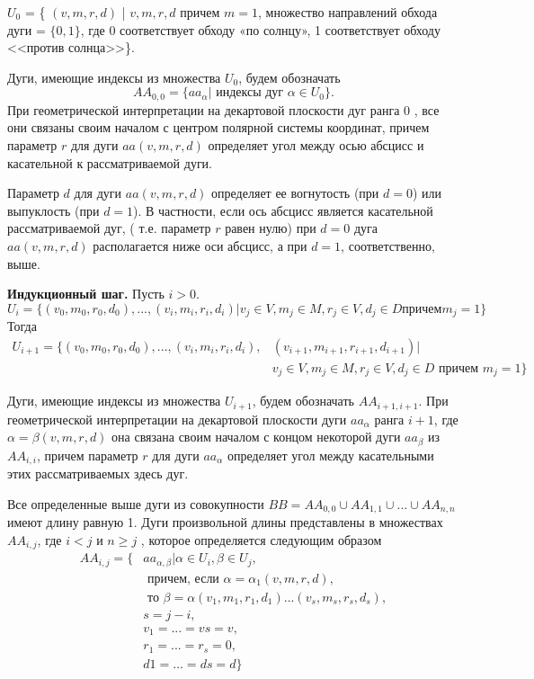 $U_0$  = \{ $(v, m, r, d)$ | $v , m , r , d$  причем  $m = 1$, множество направлений  обхода дуги   =  $\{0, 1\}$, где  0  соответствует обходу «по солнцу»,  1 соответствует обходу <<против солнца>>\}. 

\begin{remark}
Дуги, имеющие индексы из множества $U_0$,  будем обозначать 
$$AA_{0,0}  = \{aa_\alpha | \text{ индексы дуг } \alpha \in U_0 \}. $$
При геометрической интерпретации на декартовой плоскости дуг ранга 0 ,  все они связаны своим началом с центром полярной системы координат, причем параметр $r$  для дуги  $aa(v, m, r, d)$ определяет угол между осью абсцисс и касательной к  рассматриваемой дуги.  

Параметр  $d$  для дуги   $aa(v, m, r, d)$  определяет  ее вогнутость (при $d = 0$) или  выпуклость (при $d = 1$).  В частности, если   ось абсцисс является касательной  рассматриваемой дуг, ( т.е. параметр  $r$ равен нулю)  при  $d = 0$ дуга $aa(v, m, r, d)$ располагается ниже оси абсцисс, а при $d = 1$, соответственно, выше.
\end{remark}

\textbf{Индукционный шаг.}  Пусть $i > 0$. 
$$U_i = \{ (v_0, m_0, r_0, d_0), ...,(v_i, m_i, r_i, d_i) | v_j \in V , m_j \in M , r_j \in V, d_j \in D  причем  m_j = 1\}$$
Тогда
\begin{equation}
\begin{split}
U_{i+1} = \{ (v_0, m_0, r_0, d_0), ...,(v_i, m_i, r_i, d_i),& (v_{i+1}, m_{i+1}, r_{i+1}, d_{i+1}) | \\
& v_j \in V , m_j \in M , r_j \in V, d_j \in D  \text{ причем }  m_j = 1\}
\label{overlaps:4}
\end{split}
\end{equation}

\begin{remark}
Дуги, имеющие индексы из множества $U_{i+1}$,  будем обозначать $AA_{i+1,i+1}$. 
При геометрической интерпретации на декартовой плоскости дуги  $aa_\alpha$  ранга $i+1$,  где  $\alpha = \beta(v, m, r, d)$  она  связана своим началом с концом некоторой дуги $aa_\beta$ из $AA_{i,i}$, причем параметр $r$ для дуги $aa_\alpha$  определяет угол между  касательными этих  рассматриваемых здесь  дуг.  
\end{remark}
Все определенные выше дуги из совокупности 
$BB = AA_{0,0} \cup AA_{1,1} \cup ... \cup AA_{n,n}$  имеют длину равную 1. Дуги произвольной длины представлены в множествах $AA_{i,j}$,  где $i  <  j$  и  $n \geq  j$ , которое определяется следующим образом  
\begin{equation}
\begin{split}
AA_{i,j} = \{&aa_{\alpha,\beta} | \alpha \in U_i, \beta \in U_j, \\
&\text{ причем, если }  \alpha = \alpha_1(v, m, r, d), \\
&\text{ то } \beta = \alpha(v_1, m_1, r_1, d_1) ... (v_s, m_s, r_{s}, d_s), \\
&s = j - i, \\
&v_1 = ... = vs = v, \\
&r_1 =...= r_s = 0, \\
& d1 = …= ds = d \}
\end{split}
\label{overlaps:5}
\end{equation}

